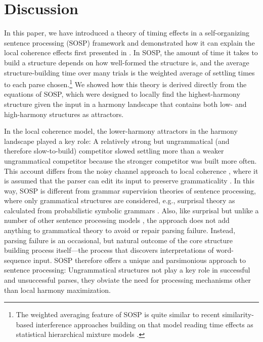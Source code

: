 \documentclass[10pt,letterpaper]{article}
\begin{document}
\section{Discussion}
In this paper, we have introduced a theory of timing effects in a self-organizing sentence processing (SOSP) framework and demonstrated how it can explain the local coherence effects first presented in \cite{tabor2004effects}. In SOSP, the amount of time it takes to build a structure depends on how well-formed the structure is, and the average structure-building time over many trials is the weighted average of settling times to each parse chosen.\footnote{The weighted averaging feature of SOSP is quite similar to recent similarity-based interference approaches building on  that model reading time effects as statistical hierarchical mixture models \cite{nicenboim2018models, vasishth2017feature}.} We showed how this theory is derived directly from the equations of SOSP, which were designed to locally find the highest-harmony structure given the input in a harmony landscape that contains both low- and high-harmony structures as attractors.

In the local coherence model, the lower-harmony attractors in the harmony landscape played a key role: A relatively strong but ungrammatical (and therefore slow-to-build) competitor slowed settling more than a weaker ungrammatical competitor because the stronger competitor was built more often. This account differs from the noisy channel approach to local coherence \cite{levy2009eye}, where it is assumed that the parser can edit its input to preserve grammaticality \cite[provide a similar approach in a dynamical, harmony based model]{cho2017incremental}. In this way, SOSP is different from grammar supervision theories of sentence processing, where only grammatical structures are considered, e.g., surprisal theory as calculated from probabilistic symbolic grammars \cite{levy2008expectation, hale2001probabilistic}. Also, like surprisal but unlike a number of other sentence processing models \cite{kimball1973seven, frazier1978sausage, gibson1991computational, eberhard2005making, lewis2005activation}, the approach does not add anything to grammatical theory to avoid or repair parsing failure. Instead, parsing failure is an occasional, but natural outcome of the core structure building process itself---the process that discovers interpretations of word-sequence input. SOSP therefore offers a unique and parsimonious approach to sentence processing: Ungrammatical structures not play a key role in successful and unsuccessful parses, they obviate the need for processing mechanisms other than local harmony maximization. %
\end{document}
